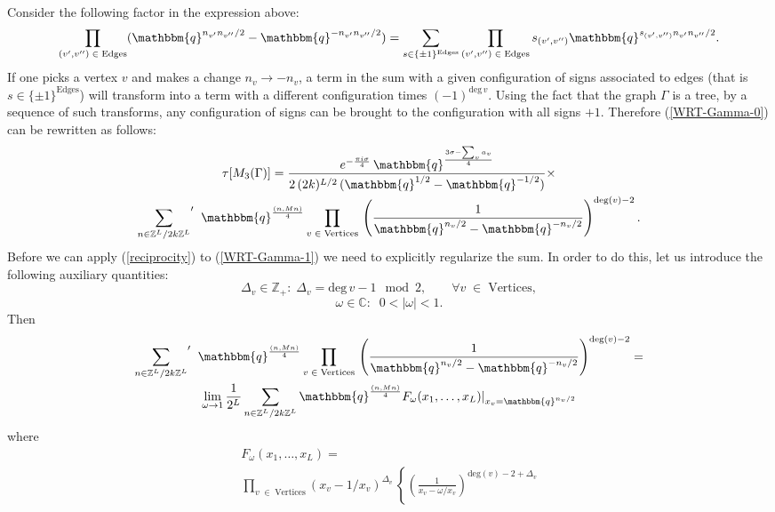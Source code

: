 \documentclass[hyper,letterpaper]{JHEP3}
\newcommand{\Z}{{\mathbb Z}}
\newcommand{\C}{{\mathbb C}}
\def\q{{\mathbbm{q}}}
\begin{document}
{Consider the following factor in the expression above:
\begin{equation}
\prod_{(v',v'')\;\in\;\text{Edges}}
(\q^{n_{v'}n_{v''}/2}-\q^{-n_{v'}n_{v''}/2})
=\sum_{{s}\in\{\pm 1\}^\text{Edges}}
\prod_{(v',v'')\;\in\;\text{Edges}}s_{(v',v'')}\q^{s_{(v',v'')}n_{v'}n_{v''}/2}.
\end{equation}
If one picks a vertex $v$ and makes a change $n_v\rightarrow -n_v$, a term in the sum with a given configuration of signs associated to edges (that is $s\in\{\pm 1\}^\text{Edges}$) will transform into a term with a different configuration times $(-1)^{\text{deg}\,v}$. Using the fact that the graph $\Gamma$ is a tree, by a sequence of such transforms, any configuration of signs can be brought to the configuration with all signs $+1$. Therefore (\ref{WRT-Gamma-0}) can be rewritten as follows:
\begin{multline}
 \tau[M_3(\Gamma)]=\frac{e^{-\frac{\pi i\sigma}{4}}\,\q^{\frac{3\sigma-\sum_v a_{v}}{4}}}{2\,(2k)^{L/2}\,(\q^{1/2}-\q^{-1/2})}
 \times\\
 {\sum_{{n}\in \Z^L/2k\Z^L}}'
\;\; \q^{\frac{(n,Mn)}{4}}
 \prod_{v\;\in\; \text{Vertices}}
\,\left(\frac{1}{\q^{n_v/2}-\q^{-n_v/2}}\right)^{\text{deg}(v)-2}.
\label{WRT-Gamma-1}
\end{multline}
Before we can apply (\ref{reciprocity}) to (\ref{WRT-Gamma-1}) we need to explicitly regularize the sum. In order to do this, let us introduce the following auxiliary quantities:
\begin{equation}
\Delta_v\in\Z_+:\; \Delta_v=\text{deg}\,v-1\mod 2,\qquad \forall v\;\in\; \text{Vertices},
\label{Delta-def}
\end{equation}
\begin{equation}
\omega\in \C:\;\;0<|\omega|<1.
\end{equation}
Then
\begin{multline}
 {\sum_{{n}\in \Z^L/2k\Z^L}}'
 \;\; \q^{\frac{(n,Mn)}{4}}
  \prod_{v\;\in\; \text{Vertices}}
 \,\left(\frac{1}{\q^{n_v/2}-\q^{-n_v/2}}\right)^{\text{deg}(v)-2}=\\
 \lim_{\omega\rightarrow 1} \frac{1}{2^L}\sum_{{n}\in \Z^L/2k\Z^L}
  \q^{\frac{(n,Mn)}{4}}
 F_\omega(x_1,\ldots,x_L)|_{x_v=\q^{n_v/2}}
 \label{WRT-omega-limit}
\end{multline}
where
\begin{multline}
F_\omega(x_1,\ldots,x_L)=\\
\prod_{v\;\in\; \text{Vertices}}\left({x_v-1/x_v}\right)^{\Delta_v}
 \,\left\{
 \left(\frac{1}{x_v-\omega/x_v}\right)^{\text{deg}(v)-2+\Delta_v}

\end{multline}}
\end{document}
